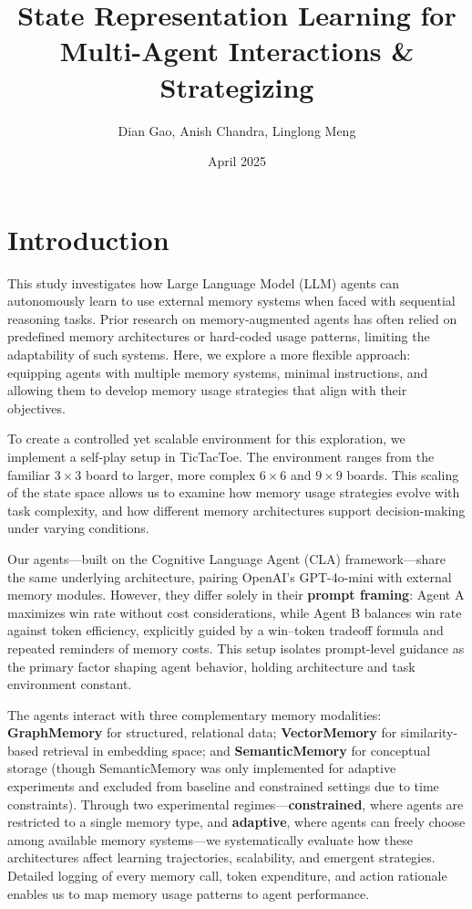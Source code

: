 \documentclass[10pt]{article}
\title{State Representation Learning for Multi-Agent Interactions \& Strategizing}
\author{Dian Gao, Anish Chandra, Linglong Meng}
\date{April 2025}
\begin{document}
\maketitle
\thispagestyle{firstpage}

\section{Introduction}

This study investigates how Large Language Model (LLM) agents can autonomously learn to use external memory systems when faced with sequential reasoning tasks. Prior research on memory-augmented agents has often relied on predefined memory architectures or hard-coded usage patterns, limiting the adaptability of such systems. Here, we explore a more flexible approach: equipping agents with multiple memory systems, minimal instructions, and allowing them to develop memory usage strategies that align with their objectives.

To create a controlled yet scalable environment for this exploration, we implement a self-play setup in TicTacToe. The environment ranges from the familiar $3 \times 3$ board to larger, more complex $6 \times 6$ and $9 \times 9$ boards. This scaling of the state space allows us to examine how memory usage strategies evolve with task complexity, and how different memory architectures support decision-making under varying conditions.

Our agents—built on the Cognitive Language Agent (CLA) framework—share the same underlying architecture, pairing OpenAI's GPT-4o-mini with external memory modules. However, they differ solely in their \textbf{prompt framing}: Agent A maximizes win rate without cost considerations, while Agent B balances win rate against token efficiency, explicitly guided by a win–token tradeoff formula and repeated reminders of memory costs. This setup isolates prompt-level guidance as the primary factor shaping agent behavior, holding architecture and task environment constant.

The agents interact with three complementary memory modalities: \textbf{GraphMemory} for structured, relational data; \textbf{VectorMemory} for similarity-based retrieval in embedding space; and \textbf{SemanticMemory} for conceptual storage (though SemanticMemory was only implemented for adaptive experiments and excluded from baseline and constrained settings due to time constraints). Through two experimental regimes—\textbf{constrained}, where agents are restricted to a single memory type, and \textbf{adaptive}, where agents can freely choose among available memory systems—we systematically evaluate how these architectures affect learning trajectories, scalability, and emergent strategies. Detailed logging of every memory call, token expenditure, and action rationale enables us to map memory usage patterns to agent performance.
\end{document}
